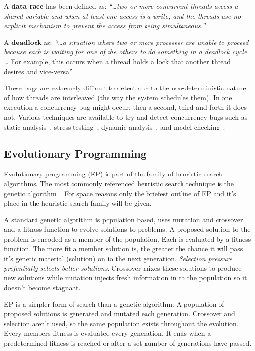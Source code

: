 \documentclass[10pt, conference, compsocconf]{IEEEtran}
\begin{document}
A \textbf{data race} has been defined as: \textit{``\ldots two or more
concurrent threads access a shared variable and when at least one access is a
write, and the threads use no explicit mechanism to prevent the access from
being simultaneous.''}~\cite{LSW07}

A \textbf{deadlock} as: \textit{``\ldots a situation where two or more
processes are unable to proceed because each is waiting for one of the others
to do something in a deadlock cycle \ldots} For example, this occurs when a
thread holds a lock that another thread desires and vice-versa''~\cite{LSW07}

These bugs are extremely difficult to detect due to the non-deterministic
nature of how threads are interleaved (the way the system schedules them). In
one execution a concurrency bug might occur, then a second, third and forth it
does not. Various techniques are available to try and detect concurrency bugs
such as static analysis~\cite{NA07,NPSG09,HP04}, stress testing~\cite{HSU03},
dynamic analysis~\cite{JNPS09,EFN+02}, and model
checking~\cite{BHPV00,RDH03,OM03,MQB07,Holz97,JM04,BHPV00,HP00}.

\subsection{Evolutionary Programming}
\label{sec:evolutionary_programming}

Evolutionary programming (EP) is part of the family of heuristic search
algorithms. The most commonly referenced heuristic search technique is the
genetic algorithm~\cite{GA92}. For space reasons only the briefest outline of
EP and it's place in the heuristic search family will be given.

A standard genetic algorithm is population based, uses mutation and crossover
and a fitness function to evolve solutions to problems. A proposed solution to
the problem is encoded as a member of the population. Each is evaluated by a
fitness function.   The more fit a member solution is, the greater the chance
it will pass it's genetic material (solution) on to the next generation.
\textit{Selection pressure prefentially selects better solutions.} Crossover
mixes these solutions to produce new solutions while mutation injects fresh
information in to the population so it doesn't become stagnant.

EP is a simpler form of search than a genetic algorithm. A population of
proposed solutions is generated and mutated each generation.  Crossover and
selection aren't used, so the same population exists throughout the evolution.
Every members fitness is evaluated every generation. It ends when a
predetermined fitness is reached or after a set number of generations have
passed.
\end{document}
